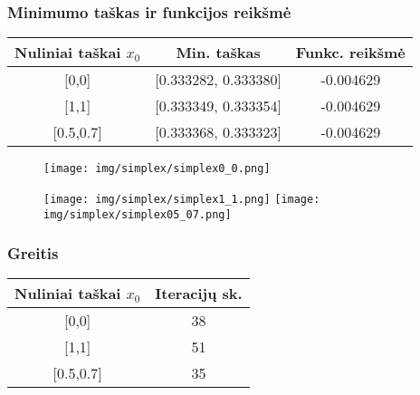 \documentclass{article}
\begin{document}
\subsubsection{Minimumo taškas ir funkcijos reikšmė}
\begin{table}[H]
    \centering
    \begin{tabular}{|c|c|c|} 
    \hline
    Nuliniai taškai $x_{0}$ & Min. taškas            & Funkc. reikšmė  \\ 
    \hline
    {[}0,0]            & {[}0.333282, 0.333380] & -0.004629       \\ 
    \hline
    {[}1,1]            & {[}0.333349, 0.333354] & -0.004629       \\ 
    \hline
    {[}0.5,0.7]        & {[}0.333368, 0.333323] & -0.004629       \\
    \hline
    \end{tabular}
\end{table}
\begin{figure}[H]
    \begin{adjustbox}{margin=0pt,center}
        \texttt{[image: img/simplex/simplex0\_0.png]}
    \end{adjustbox}
\end{figure}
\begin{figure}[H]
    \begin{adjustbox}{margin=0pt,center}
        \texttt{[image: img/simplex/simplex1\_1.png]}%
        \texttt{[image: img/simplex/simplex05\_07.png]}
    \end{adjustbox}
\end{figure}

\subsubsection{Greitis}
\begin{table}[H]
    \centering
    \begin{tabular}{|c|c|} 
    \hline
    Nuliniai taškai $x_{0}$ & Iteracijų sk.  \\ 
    \hline
    {[}0,0]            & 38             \\ 
    \hline
    {[}1,1]            & 51             \\ 
    \hline
    {[}0.5,0.7]        & 35             \\
    \hline
    \end{tabular}
\end{table}
\end{document}
